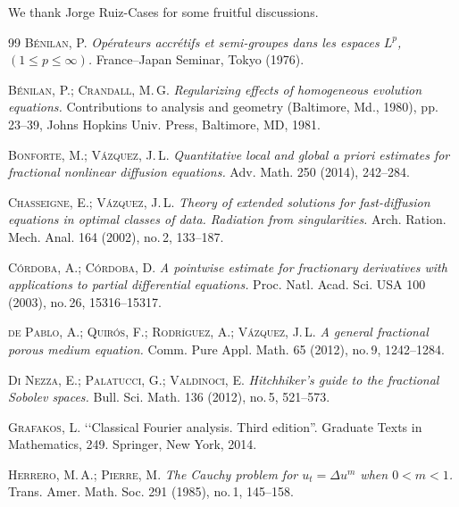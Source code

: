 \documentclass[leqno,12pt]{amsart}
\theoremstyle{definition}
\theoremstyle{remark}
\numberwithin{equation}{section}
\begin{document}
We thank Jorge Ruiz-Cases for some fruitful discussions.
\begin{thebibliography}{99}
    \textsc{B\'enilan, P.}  
    \emph{Op\'erateurs accr\'etifs et semi-groupes dans les espaces $L^p$, $(1 \le p \le \infty)$.} 
   France--Japan Seminar, Tokyo (1976).

   \textsc{B\'enilan, P.; Crandall, M.\,G.}
     \emph{Regularizing effects of homogeneous evolution equations.} Contributions to analysis and geometry (Baltimore, Md., 1980),  pp. 23--39, Johns Hopkins Univ. Press, Baltimore, MD, 1981. 
     
    \textsc{Bonforte, M.; Vázquez, J.\,L.} 
    \emph{Quantitative local and global a priori estimates for fractional nonlinear diffusion equations.} 
    Adv. Math. 250 (2014), 242--284.


    \textsc{Chasseigne, E.; Vázquez, J.\,L.}
    \emph{Theory of extended solutions for fast-diffusion equations in optimal classes of data. Radiation from singularities.} 
    Arch. Ration. Mech. Anal. 164 (2002), no.\,2, 133--187.

    \textsc{Córdoba, A.; Córdoba, D.} 
    \emph{A pointwise estimate for fractionary derivatives with applications to partial differential equations.} 
     Proc. Natl. Acad. Sci. USA 100 (2003), no.\,26, 15316--15317. 

    \textsc{de Pablo, A.; Quirós, F.; Rodríguez, A.; Vázquez, J.\,L.} 
    \emph{A general fractional porous medium equation.}
    Comm. Pure Appl. Math. 65 (2012), no.\,9, 1242--1284. 

    \textsc{Di Nezza, E.; Palatucci, G.; Valdinoci, E.}
    \emph{Hitchhiker's guide to the fractional Sobolev spaces.} 
    Bull. Sci. Math. 136 (2012), no.\,5, 521--573. 
 
    \textsc{Grafakos, L.} 
    \lq\lq Classical Fourier analysis. Third edition''. 
    Graduate Texts in Mathematics, 249. Springer, New York, 2014. 
    
    \textsc{Herrero, M.\,A.; Pierre, M.} 
    \emph{The Cauchy problem for \(u_t= \Delta u^m \) when \(0 < m < 1\).} 
    Trans. Amer. Math. Soc. 291 (1985), no.\,1, 145--158.


\end{thebibliography}
\end{document}
